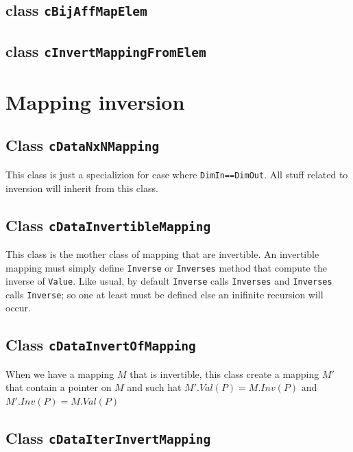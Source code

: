 \subsection{class {\tt cBijAffMapElem}}
\subsection{class {\tt cInvertMappingFromElem}}


\section{Mapping inversion}

\subsection{Class {\tt cDataNxNMapping}}

This class is just a specializion for case where {\tt DimIn==DimOut}. All stuff
related to inversion will inherit from this class.


\subsection{Class {\tt cDataInvertibleMapping}}

This class is the mother class of mapping that are invertible. An invertible
mapping must simply define {\tt Inverse}  or {\tt Inverses} method that compute
the inverse of {\tt Value}.  Like usual, by default {\tt Inverse} calls  {\tt Inverses}
and {\tt Inverses} calls  {\tt Inverse}; so one at least must be defined else an
inifinite recursion will occur.


\subsection{Class {\tt cDataInvertOfMapping}}

When we have a mapping $M$ that is invertible, this class create a mapping $M'$
that contain a pointer on $M$ and such hat  $M'.Val(P) = M.Inv(P)$ and $M'.Inv(P) = M.Val(P)$


\subsection{Class {\tt cDataIterInvertMapping}}

